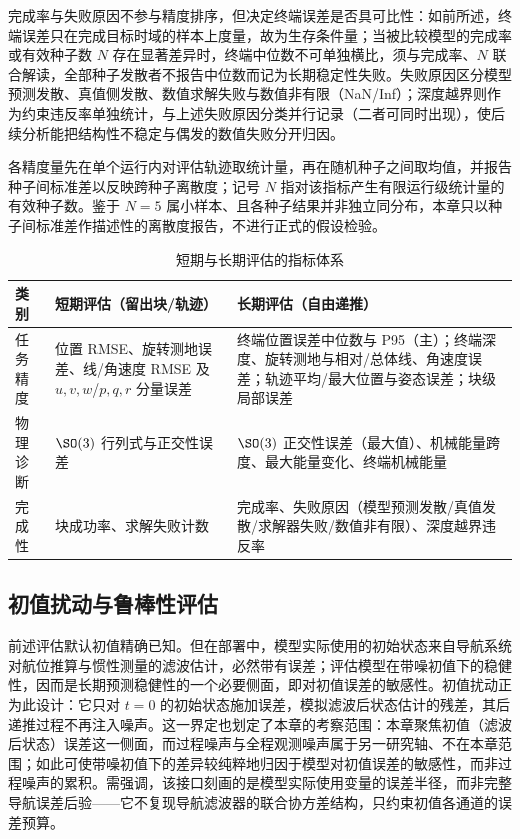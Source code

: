 完成率与失败原因不参与精度排序，但决定终端误差是否具可比性：如前所述，终端误差只在完成目标时域的样本上度量，故为生存条件量；当被比较模型的完成率或有效种子数 \(N\) 存在显著差异时，终端中位数不可单独横比，须与完成率、\(N\) 联合解读，全部种子发散者不报告中位数而记为长期稳定性失败。失败原因区分模型预测发散、真值侧发散、数值求解失败与数值非有限（NaN/Inf）；深度越界则作为约束违反率单独统计，与上述失败原因分类并行记录（二者可同时出现），使后续分析能把结构性不稳定与偶发的数值失败分开归因。

各精度量先在单个运行内对评估轨迹取统计量，再在随机种子之间取均值，并报告种子间标准差以反映跨种子离散度；记号 \(N\) 指对该指标产生有限运行级统计量的有效种子数。鉴于 \(N=5\) 属小样本、且各种子结果并非独立同分布，本章只以种子间标准差作描述性的离散度报告，不进行正式的假设检验。

\begin{table}[htbp]
  \centering
  \caption{短期与长期评估的指标体系}
  \label{tab:metrics}
  \begin{tabularx}{\textwidth}{>{\raggedright\arraybackslash}p{}>{\raggedright\arraybackslash}X>{\raggedright\arraybackslash}X}
    \toprule
    类别 & 短期评估（留出块/轨迹） & 长期评估（自由递推） \\
    \midrule
    任务精度 & 位置 RMSE、旋转测地误差、线/角速度 RMSE 及 \(u,v,w\)/\(p,q,r\) 分量误差 & 终端位置误差中位数与 P95（主）；终端深度、旋转测地与相对/总体线、角速度误差；轨迹平均/最大位置与姿态误差；块级局部误差 \\
    物理诊断 & \(\SO(3)\) 行列式与正交性误差 & \(\SO(3)\) 正交性误差（最大值）、机械能量跨度、最大能量变化、终端机械能量 \\
    完成性 & 块成功率、求解失败计数 & 完成率、失败原因（模型预测发散/真值发散/求解器失败/数值非有限）、深度越界违反率 \\
    \bottomrule
  \end{tabularx}
\end{table}

\subsection{初值扰动与鲁棒性评估}
\label{subsec:ic-perturbation}

前述评估默认初值精确已知。但在部署中，模型实际使用的初始状态来自导航系统对航位推算与惯性测量的滤波估计，必然带有误差；评估模型在带噪初值下的稳健性，因而是长期预测稳健性的一个必要侧面，即对初值误差的敏感性。初值扰动正为此设计：它只对 \(t=0\) 的初始状态施加误差，模拟滤波后状态估计的残差，其后递推过程不再注入噪声。这一界定也划定了本章的考察范围：本章聚焦初值（滤波后状态）误差这一侧面，而过程噪声与全程观测噪声属于另一研究轴、不在本章范围；如此可使带噪初值下的差异较纯粹地归因于模型对初值误差的敏感性，而非过程噪声的累积。需强调，该接口刻画的是模型实际使用变量的误差半径，而非完整导航误差后验——它不复现导航滤波器的联合协方差结构，只约束初值各通道的误差预算。

